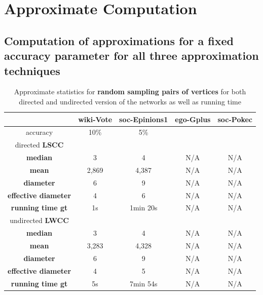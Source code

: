 \documentclass[12pt,a4paper]{article}
\begin{document}
\section{Approximate Computation}

\subsection{Computation of approximations for a fixed accuracy parameter for all three approximation techniques}

\begin{table}[h!]
\centering
\caption{Approximate statistics for \textbf{random sampling pairs of vertices} for both directed and undirected version of the networks as well as running time}
\begin{tabular}{c|c|c|c|c}
	& \textbf{wiki-Vote}	& \textbf{soc-Epinions1}	& \textbf{ego-Gplus}	&	\textbf{soc-Pokec}\\ \hline
accuracy	& 10\% 	&5\% 	& 	&	\\ \hline
directed \textbf{LSCC}	& 	& 	& 	&	\\ \hline
\textbf{median} 			&3	 			&4					&N/A				&N/A	\\
\textbf{mean} 			&2,869 			&4,387				&N/A				&N/A	\\
\textbf{diameter} 		&6	 			&9					&N/A				&N/A	\\
\textbf{effective diameter} 	&4	 			&6					&N/A				&N/A	\\
\textbf{running time gt}	&1s				&1min 20s			&N/A				&N/A	\\ \hline
undirected \textbf{LWCC}	& 	& 	& 	&	\\ \hline
\textbf{median} 			&3	 			&4					&N/A				&N/A	\\
\textbf{mean} 			&3,283 			&4,328				&N/A				&N/A	\\
\textbf{diameter} 		&6	 			&9					&N/A				&N/A	\\
\textbf{effective diameter} 	&4	 			&5					&N/A				&N/A	\\
\textbf{running time gt} 	&5s				&7min 54s			&N/A				&N/A
\end{tabular}
\label{tab:approximatestatistics_randomsample}
\end{table}
\end{document}
